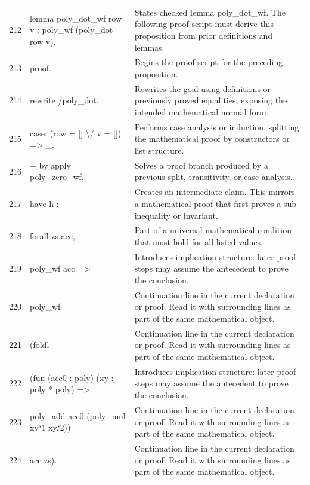 \documentclass[10pt]{article}
\begin{document}
\begin{longtable}{r L{0.53\textwidth} L{0.37\textwidth}}
212 & {\ttfamily\scriptsize lemma poly\_dot\_wf row v : poly\_wf (poly\_dot row v).} & States checked lemma poly\_dot\_wf.  The following proof script must derive this proposition from prior definitions and lemmas. \\
213 & {\ttfamily\scriptsize proof.} & Begins the proof script for the preceding proposition. \\
214 & {\ttfamily\scriptsize rewrite /poly\_dot.} & Rewrites the goal using definitions or previously proved equalities, exposing the intended mathematical normal form. \\
215 & {\ttfamily\scriptsize case: (row = [] \textbackslash{}/ v = []) => \_.} & Performs case analysis or induction, splitting the mathematical proof by constructors or list structure. \\
216 & {\ttfamily\scriptsize + by apply poly\_zero\_wf.} & Solves a proof branch produced by a previous split, transitivity, or case analysis. \\
217 & {\ttfamily\scriptsize have h :} & Creates an intermediate claim.  This mirrors a mathematical proof that first proves a sub-inequality or invariant. \\
218 & {\ttfamily\scriptsize   forall zs acc,} & Part of a universal mathematical condition that must hold for all listed values. \\
219 & {\ttfamily\scriptsize     poly\_wf acc =>} & Introduces implication structure: later proof steps may assume the antecedent to prove the conclusion. \\
220 & {\ttfamily\scriptsize     poly\_wf} & Continuation line in the current declaration or proof.  Read it with surrounding lines as part of the same mathematical object. \\
221 & {\ttfamily\scriptsize       (foldl} & Continuation line in the current declaration or proof.  Read it with surrounding lines as part of the same mathematical object. \\
222 & {\ttfamily\scriptsize         (fun (acc0 : poly) (xy : poly * poly) =>} & Introduces implication structure: later proof steps may assume the antecedent to prove the conclusion. \\
223 & {\ttfamily\scriptsize           poly\_add acc0 (poly\_mul xy.`1 xy.`2))} & Continuation line in the current declaration or proof.  Read it with surrounding lines as part of the same mathematical object. \\
224 & {\ttfamily\scriptsize         acc zs).} & Continuation line in the current declaration or proof.  Read it with surrounding lines as part of the same mathematical object. \\

\end{longtable}
\end{document}

